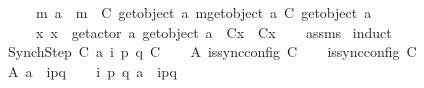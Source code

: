 \begin{isabellebody}
\ \ \ \ \ {\isachardoublequoteopen}{\isasymexists}m{\isachardot}{\kern0pt}\ a\ {\isacharequal}{\kern0pt}\ {\isacharbang}{\kern0pt}{\isasymlangle}m{\isasymrangle}\ {\isasymand}\ C{}\ {\isacharparenleft}{\kern0pt}get{\isacharunderscore}{\kern0pt}object\ a{\isacharparenright}{\kern0pt}\ {\isasymmidarrow}{\isacharquery}{\kern0pt}{\isasymlangle}m{\isasymrangle}{\isasymrightarrow}{\isacharparenleft}{\kern0pt}get{\isacharunderscore}{\kern0pt}object\ a{\isacharparenright}{\kern0pt}\ {\isacharparenleft}{\kern0pt}C{}\ {\isacharparenleft}{\kern0pt}get{\isacharunderscore}{\kern0pt}object\ a{\isacharparenright}{\kern0pt}{\isacharparenright}{\kern0pt}{\isachardoublequoteclose}\isanewline
\ \ \ \ \ {\isachardoublequoteopen}{\isasymforall}x{\isachardot}{\kern0pt}\ x\ {\isasymnotin}\ {\isacharbraceleft}{\kern0pt}get{\isacharunderscore}{\kern0pt}actor\ a{\isacharcomma}{\kern0pt}\ get{\isacharunderscore}{\kern0pt}object\ a{\isacharbraceright}{\kern0pt}\ {\isasymlongrightarrow}\ C{}{\isacharparenleft}{\kern0pt}x{\isacharparenright}{\kern0pt}\ {\isacharequal}{\kern0pt}\ C{}{\isacharparenleft}{\kern0pt}x{\isacharparenright}{\kern0pt}{\isachardoublequoteclose}\isanewline
%
\isadelimproof
\ \ %
\endisadelimproof
%
\isatagproof
{}\isamarkupfalse%
\ assms\isanewline
{}\isamarkupfalse%
\ induct\isanewline
\ \ \isamarkupfalse%
\ {\isacharparenleft}{\kern0pt}SynchStep\ C{}\ a\ i\ p\ q\ C{}{\isacharparenright}{\kern0pt}\isanewline
\ \ \isamarkupfalse%
\ A{}{\isacharcolon}{\kern0pt}\ {\isachardoublequoteopen}is{\isacharunderscore}{\kern0pt}sync{\isacharunderscore}{\kern0pt}config\ C{}{\isachardoublequoteclose}\isanewline
\ \ \isamarkupfalse%
\ {\isachardoublequoteopen}is{\isacharunderscore}{\kern0pt}sync{\isacharunderscore}{\kern0pt}config\ C{}{\isachardoublequoteclose}\ \isakeywordONE{{\isachardot}{\kern0pt}}\isamarkupfalse%
\isanewline
\ \ \isamarkupfalse%
\ A{}{\isacharcolon}{\kern0pt}\ {\isachardoublequoteopen}a\ {\isacharequal}{\kern0pt}\ {\isacharbang}{\kern0pt}{\isasymlangle}{\isacharparenleft}{\kern0pt}i\isactrlbsup p{\isasymrightarrow}q\isactrlesup {\isacharparenright}{\kern0pt}{\isasymrangle}{\isachardoublequoteclose}\isanewline
\ \ \isamarkupfalse%
\ {\isachardoublequoteopen}{\isasymexists}i\ p\ q{\isachardot}{\kern0pt}\ a\ {\isacharequal}{\kern0pt}\ {\isacharbang}{\kern0pt}{\isasymlangle}{\isacharparenleft}{\kern0pt}i\isactrlbsup p{\isasymrightarrow}q\isactrlesup {\isacharparenright}{\kern0pt}{\isasymrangle}{\isachardoublequoteclose}\isanewline

\end{isabellebody}
